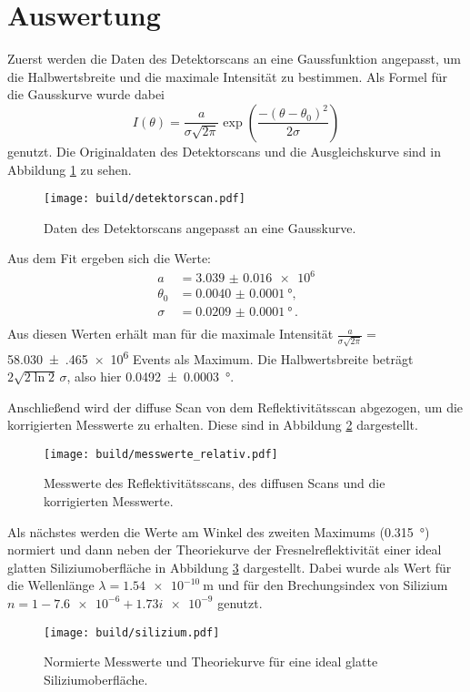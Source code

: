 \section{Auswertung}
\label{sec:Auswertung}

Zuerst werden die Daten des Detektorscans an eine Gaussfunktion angepasst, um die Halbwertsbreite und die maximale Intensität zu bestimmen. Als Formel für die Gausskurve wurde dabei 
\begin{equation*}
  I(\theta) = \frac{a}{\sigma\sqrt{2\pi}} \exp\left( \frac{-\left( \theta - \theta_0\right)^2}{2 \sigma} \right)
\end{equation*}
genutzt. Die Originaldaten des Detektorscans und die Ausgleichskurve sind in Abbildung \ref{fig:detektor} zu sehen.

\begin{figure}[H]
    \centering
    \texttt{[image: build/detektorscan.pdf]}
    \caption{Daten des Detektorscans angepasst an eine Gausskurve.}
    \label{fig:detektor}
  \end{figure}
Aus dem Fit ergeben sich die Werte:
\begin{align*}
  a &= \num{3.039(16)e6} \\
  \theta_0 &= \SI{0.0040(1)}{\degree} , \\
  \sigma &= \SI{0.0209(1)}{\degree}\,. \\
  \end{align*}
Aus diesen Werten erhält man für die maximale Intensität $ \frac{a}{\sigma\sqrt{2\pi}}=$ \num{58.030(465)e6} Events als Maximum. 
Die Halbwertsbreite beträgt $2 \sqrt{2 \ln 2} \, \sigma$, also hier \SI{0.0492(3)}{\degree}.

Anschließend wird der diffuse Scan von dem Reflektivitätsscan abgezogen, um die korrigierten Messwerte zu erhalten. Diese sind in Abbildung \ref{fig:messwerte} dargestellt.
  \begin{figure}[H]
    \centering
    \texttt{[image: build/messwerte\_relativ.pdf]}
    \caption{Messwerte des Reflektivitätsscans, des diffusen Scans und die korrigierten Messwerte.}
    \label{fig:messwerte}
  \end{figure}

Als nächstes werden die Werte am Winkel des zweiten Maximums (\SI{0.315}{\degree}) normiert und dann neben der Theoriekurve der Fresnelreflektivität einer ideal glatten Siliziumoberfläche in Abbildung \ref{abb:norm} dargestellt. Dabei wurde als Wert für die Wellenlänge $\lambda = \SI{1.54e-10}{\meter}$ und für den Brechungsindex von Silizium $n = \num{1} - \num{7.6e-6} + \num{1.73i e-9}$ genutzt.
\begin{figure}
    \centering
    \texttt{[image: build/silizium.pdf]}
    \caption{Normierte Messwerte und Theoriekurve für eine ideal glatte Siliziumoberfläche.}
    \label{abb:norm}
\end{figure}

